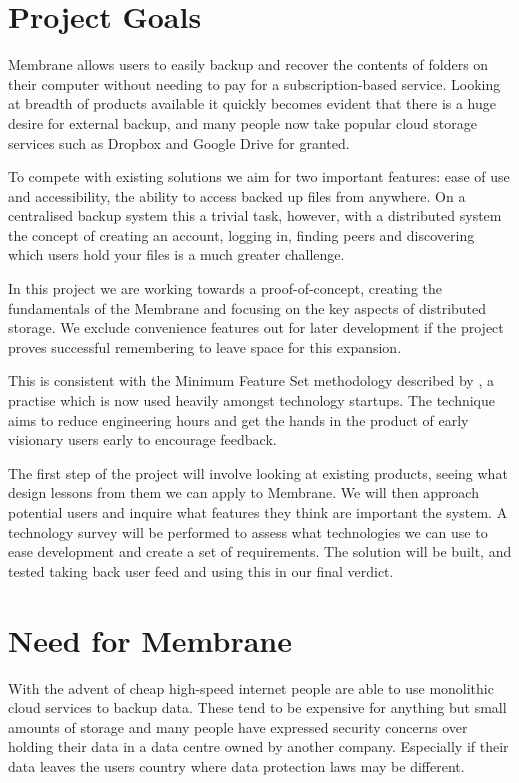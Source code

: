 \documentclass[11pt, a4paper, twocolumn, twoside]{report}
\begin{document}
\section{Project Goals}

Membrane allows users to easily backup and recover the contents of folders on their computer without needing to pay for a subscription-based service. Looking at breadth of products available it quickly becomes evident that there is a huge desire for external backup, and many people now take popular cloud storage services such as Dropbox and Google Drive for granted. \citep{dropbox2015popularity}

To compete with existing solutions we aim for two important features: ease of use and accessibility, the ability to access backed up files from anywhere. On a centralised backup system this a trivial task, however, with a distributed system the concept of creating an account, logging in, finding peers and discovering which users hold your files is a much greater challenge.

In this project we are working towards a proof-of-concept, creating the fundamentals of the Membrane and focusing on the key aspects of distributed storage. We exclude convenience features out for later development if the project proves successful remembering to leave space for this expansion.

This is consistent with the Minimum Feature Set methodology described by \cite{blank2010mfs}, a practise which is now used heavily amongst technology startups. The technique aims to reduce engineering hours and get the hands in the product of early visionary users early to encourage feedback.

The first step of the project will involve looking at existing products, seeing what design lessons from them we can apply to Membrane. We will then approach potential users and inquire what features they think are important the system. A technology survey will be performed to assess what technologies we can use to ease development and create a set of requirements. The solution will be built, and tested taking back user feed and using this in our final verdict.

\section{Need for Membrane}

With the advent of cheap high-speed internet people are able to use monolithic cloud services to backup data. These tend to be expensive for anything but small amounts of storage and many people have expressed security concerns over holding their data in a data centre owned by another company. \citep{batters2010dbsecurity} Especially if their data leaves the users country where data protection laws may be different.
\end{document}
